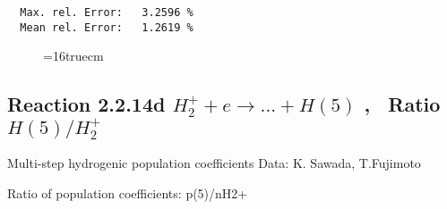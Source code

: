 \documentclass[12pt,dvipdfmx]{article}
\begin{document}
\begin{small}
\begin{verbatim}
  Max. rel. Error:   3.2596 %
  Mean rel. Error:   1.2619 %

\end{verbatim}\end{small}
\begin{figure} \label{2.2.14c}
\epsfxsize=16truecm
\end{figure}
\newpage


\subsection{
Reaction 2.2.14d $ H_2^+ + e \rightarrow ...+ H(5) $ , \   Ratio $H(5)/H_2^+  $
}

 Multi-step hydrogenic population coefficients
 Data: K. Sawada, T.Fujimoto \cite{kn:Sawada}

 Ratio of population coefficients: p(5)/nH2+
\end{document}
